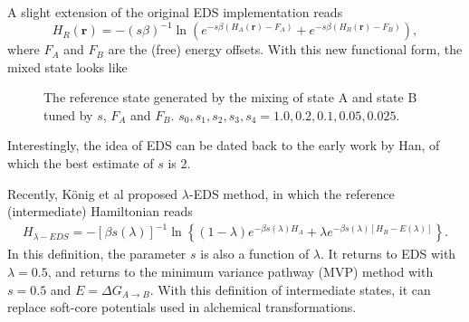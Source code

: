 A slight extension of the original EDS implementation reads
\begin{equation}
	H_R(\mathbf{r})=-\left(s\beta\right)^{-1}\ln{\left(e^{-s\beta (H_A(\mathbf{r})-F_A)}+e^{-s\beta (H_B(\mathbf{r})-F_B)}\right)},
	\label{Eq:ES:EDS:H_Rext}
\end{equation}
where $F_A$ and $F_B$ are the (free) energy offsets. With this new functional form, the mixed state looks like
\begin{figure}[htbp]
	\centering
	\caption{The reference state generated by the mixing of state A and state B tuned by $s$, $F_A$ and $F_B$. $s_0, s_1, s_2, s_3, s_4 = 1.0, 0.2, 0.1, 0.05, 0.025$.}\label{Fig:ES:EDS_ext}
\end{figure}

Interestingly, the idea of EDS can be dated back to the early work by Han\cite{HanPRA1992}, of which the best estimate of $s$ is 2.

Recently, K\"onig et al proposed $\lambda$-EDS method\cite{KonigJCIM2020}, in which the reference (intermediate) Hamiltonian reads
\begin{align}
	H_{\lambda-EDS}=-[\beta s(\lambda)]^{-1}\ln\left\{(1-\lambda)e^{-\beta s(\lambda)H_A}+\lambda e^{-\beta s(\lambda)[H_B-E(\lambda)]}\right\}.
\end{align}
In this definition, the parameter $s$ is also a function of $\lambda$. It returns to EDS with $\lambda=0.5$, and returns to the minimum variance pathway (MVP) method\cite{BlondelJCC2004} with $s=0.5$ and $E=\Delta G_{A\rightarrow B}$. With this definition of intermediate states, it can replace soft-core potentials\cite{ZachariasJCP1994} used in alchemical transformations.